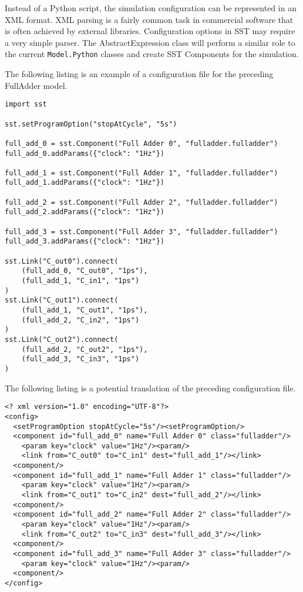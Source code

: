 Instead of a Python script, the simulation configuration can be represented in an XML format. XML parsing is a fairly common task in commercial software that is often achieved by external libraries. Configuration options in SST may require a very simple parser. The AbstractExpression class will perform a similar role to the current \texttt{Model.Python} classes and create SST Components for the simulation.

The following listing is an example of a configuration file for the preceding FullAdder model.
\begin{lstlisting}[style=customPython,label=runPy,caption=Example SST Configuration File \\ File: run.py]
import sst

sst.setProgramOption("stopAtCycle", "5s")

full_add_0 = sst.Component("Full Adder 0", "fulladder.fulladder")
full_add_0.addParams({"clock": "1Hz"})

full_add_1 = sst.Component("Full Adder 1", "fulladder.fulladder")
full_add_1.addParams({"clock": "1Hz"})

full_add_2 = sst.Component("Full Adder 2", "fulladder.fulladder")
full_add_2.addParams({"clock": "1Hz"})

full_add_3 = sst.Component("Full Adder 3", "fulladder.fulladder")
full_add_3.addParams({"clock": "1Hz"})

sst.Link("C_out0").connect(
    (full_add_0, "C_out0", "1ps"),
    (full_add_1, "C_in1", "1ps")
)
sst.Link("C_out1").connect(
    (full_add_1, "C_out1", "1ps"),
    (full_add_2, "C_in2", "1ps")
)
sst.Link("C_out2").connect(
    (full_add_2, "C_out2", "1ps"),
    (full_add_3, "C_in3", "1ps")
)
\end{lstlisting}

The following listing is a potential translation of the preceding configuration file.
\begin{lstlisting}[style=customXML,label=xml,caption=Potential Implementation of an SST Configuration File \\ File: run.xml]
<? xml version="1.0" encoding="UTF-8"?>
<config>
  <setProgramOption stopAtCycle="5s"/><setProgramOption/>
  <component id="full_add_0" name="Full Adder 0" class="fulladder"/>
    <param key="clock" value="1Hz"/><param/>
    <link from="C_out0" to="C_in1" dest="full_add_1"/></link>
  <component/>
  <component id="full_add_1" name="Full Adder 1" class="fulladder"/>
    <param key="clock" value="1Hz"/><param/>
    <link from="C_out1" to="C_in2" dest="full_add_2"/></link>
  <component/>
  <component id="full_add_2" name="Full Adder 2" class="fulladder"/>
    <param key="clock" value="1Hz"/><param/>
    <link from="C_out2" to="C_in3" dest="full_add_3"/></link>
  <component/>
  <component id="full_add_3" name="Full Adder 3" class="fulladder"/>
    <param key="clock" value="1Hz"/><param/>
  <component/>
</config>
\end{lstlisting}

